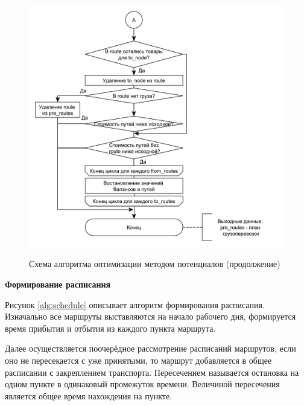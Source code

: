 \begin{figure}[h]
	\begin{center}
		{\includegraphics[scale=0.7, angle=0, page=1]{img/potential_optimize_2.pdf}}
		\caption{Схема алгоритма оптимизации методом потенциалов (продолжение)}
		\label{alg:potential_2}
	\end{center}
\end{figure}

\pagebreak
\textbf{Формирование расписания}

Рисунок \ref{alg:schedule} описывает алгоритм формирования расписания. Изначально все маршруты выставляются на начало рабочего дня, формируется время прибытия и отбытия из каждого пункта маршрута.

Далее осуществляется поочерёдное рассмотрение расписаний маршрутов, если оно не пересекается с уже принятыми, то маршрут добавляется в общее расписании с закреплением транспорта. Пересечением называется остановка на одном пункте в одинаковый промежуток времени. Величиной пересечения является общее время нахождения на пункте.

